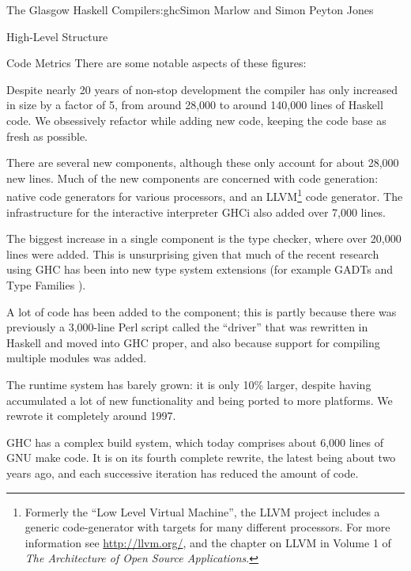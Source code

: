 \begin{aosachapter}{The Glasgow Haskell Compiler}{s:ghc}{Simon Marlow and Simon Peyton Jones}
\begin{aosasect1}{High-Level Structure}
\begin{aosasect2}{Code Metrics}
There are some notable aspects of these figures:

\begin{aosaitemize}

\item Despite nearly 20 years of non-stop development the compiler has
  only increased in size by a factor of 5, from around 28,000 to
  around 140,000 lines of Haskell code.  We obsessively refactor while
  adding new code, keeping the code base as fresh as possible.

\item There are several new components, although these only account
  for about 28,000 new lines.  Much of the new components are
  concerned with code generation: native code generators for various
  processors, and an LLVM\footnote{Formerly the ``Low Level Virtual
    Machine'', the LLVM project includes a generic code-generator with
    targets for many different processors. For more information see
    \url{http://llvm.org/}, and the chapter on LLVM in Volume 1 of 
    \emph{The Architecture of Open Source Applications}.} code
  generator.  The infrastructure for the interactive interpreter GHCi
  also added over 7,000 lines.

\item The biggest increase in a single component is the type checker,
  where over 20,000 lines were added.  This is unsurprising given that
  much of the recent research using GHC has been into new type system
  extensions (for example GADTs \cite{bib:gadts} and Type
  Families \cite{bib:type-families}).

\item A lot of code has been added to the  component; this
  is partly because there was previously a 3,000-line Perl script
  called the ``driver'' that was rewritten in Haskell and moved into
  GHC proper, and also because support for compiling multiple modules
  was added.

\item The runtime system has barely grown: it is only 10\% larger,
  despite having accumulated a lot of new functionality and being
  ported to more platforms.  We rewrote it completely around 1997.

\item GHC has a complex build system, which today comprises about
  6,000 lines of GNU make code.  It is on its fourth complete rewrite,
  the latest being about two years ago, and each successive iteration
  has reduced the amount of code.


\end{aosaitemize}
\end{aosasect2}
\end{aosasect1}
\end{aosachapter}
